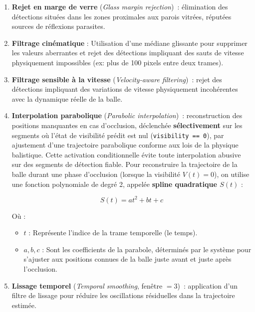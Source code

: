 \begin{enumerate}[label=\textbf{\arabic*.}, leftmargin=*, itemsep=4pt]

    \item \textbf{Rejet en marge de verre}
    (\textit{Glass margin rejection})~: élimination des détections
    situées dans les zones proximales aux parois vitrées, réputées
    sources de réflexions parasites.
 
    \item \textbf{Filtrage cinématique }
    : Utilisation d'une médiane glissante pour supprimer les valeurs aberrantes et rejet des détections impliquant des sauts de vitesse physiquement impossibles (ex: plus de 100 pixels entre deux trames).
 
    \item \textbf{Filtrage sensible à la vitesse}
    (\textit{Velocity-aware filtering})~: rejet des détections impliquant
    des variations de vitesse physiquement incohérentes avec la dynamique
    réelle de la balle.
 
    \item \textbf{Interpolation parabolique}
    (\textit{Parabolic interpolation})~: reconstruction des positions
    manquantes en cas d'occlusion, déclenchée \textbf{sélectivement} sur les segments où
    l'état de visibilité prédit est nul (\texttt{visibility == 0}), par
    ajustement d'une trajectoire parabolique conforme aux lois de la
    physique balistique. Cette activation conditionnelle évite toute
    interpolation abusive sur des segments de détection fiable.
    Pour reconstruire la trajectoire de la balle durant une phase d'occlusion (lorsque la visibilité $V(t) = 0$), on utilise une fonction polynomiale de degré 2, appelée \textbf{spline quadratique $S(t)$} :

\begin{equation}
    S(t) = at^2 + bt + c
\end{equation}

Où :
\begin{itemize}
    \item $t$ : Représente l'indice de la trame temporelle (le temps).
    \item $a, b, c$ : Sont les coefficients de la parabole, déterminés par le système pour s'ajuster aux positions connues de la balle juste avant et juste après l'occlusion.
\end{itemize}
 
    \item \textbf{Lissage temporel}
    (\textit{Temporal smoothing}, fenêtre $= 3$)~: application d'un
    filtre de lissage pour réduire les oscillations résiduelles dans la
    trajectoire estimée.
 
\end{enumerate}
 
